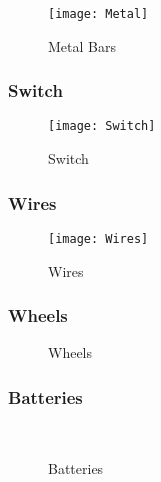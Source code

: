 \documentclass[12pt]{article}
\begin{document}
\begin{figure}[H]
	\centering
	\texttt{[image: Metal]}
	\caption{Metal Bars} \label{fig:metal}
\end{figure}

\subsubsection{Switch} \label{subsub:switch}

\begin{figure}[H]
	\centering
	\texttt{[image: Switch]}
	\caption{Switch} \label{fig:switch}
\end{figure}

\subsubsection{Wires} \label{subsub:wires}

\begin{figure}[H]
	\centering
	\texttt{[image: Wires]}
	\caption{Wires} \label{fig:wires}
\end{figure}

\subsubsection{Wheels} \label{subsub:wheels}

\begin{figure}[H]
	\centering
	 \hspace{0.5cm}
	\caption{Wheels} \label{fig:wheels}
\end{figure}

\subsubsection{Batteries} \label{subsub:batteries}

\begin{figure}[H]
	\centering
	 \hspace{0.5cm}
	 \\ \vspace{0.5cm}
	\caption{Batteries} \label{fig:batteries}
\end{figure}
\end{document}
